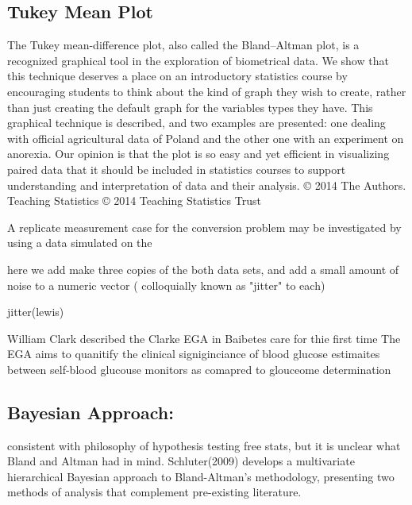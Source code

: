 \subsection*{Tukey Mean Plot}
The Tukey mean-difference plot, also called the Bland–Altman plot, is a recognized graphical tool in the exploration of biometrical data. We show that this technique deserves a place on an introductory statistics course by encouraging students to think about the kind of graph they wish to create, rather than just creating the default graph for the variables types they have. This graphical technique is described, and two examples are presented: one dealing with official agricultural data of Poland and the other one with an experiment on anorexia. Our opinion is that the plot is so easy and yet efficient in visualizing paired data that it should be included in statistics courses to support understanding and interpretation of data and their analysis. 
© 2014 The Authors. Teaching Statistics © 2014 Teaching Statistics Trust



A replicate measurement case for the conversion problem may be investigated by using a data simulated on the

here we add make three copies of the both data sets, and add a small amount of noise to a numeric vector ( colloquially known as 
"jitter" to each)

jitter(lewis)




William Clark described the Clarke EGA in Baibetes care for thie first time The EGA aims to quanitify the clinical signiginciance of blood glucose estimaites
between self-blood glucouse monitors as comapred to glouceome determination

\subsection*{Bayesian Approach: }
consistent with philosophy of hypothesis testing free stats, but it is unclear what Bland and Altman had in mind.
Schluter(2009) develops a multivariate hierarchical Bayesian approach to Bland-Altman’s methodology, presenting two methods of analysis that complement pre-existing literature. 


